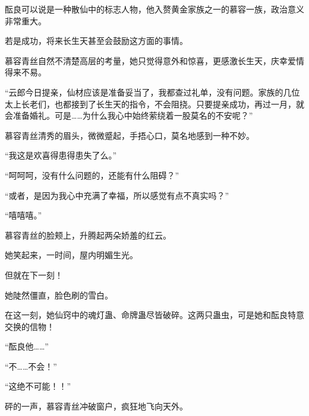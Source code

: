 \begin{this_body}
酝良可以说是一种散仙中的标志人物，他入赘黄金家族之一的慕容一族，政治意义非常重大。

若是成功，将来长生天甚至会鼓励这方面的事情。

慕容青丝自然不清楚高层的考量，她只觉得意外和惊喜，更感激长生天，庆幸爱情得来不易。

“云郎今日提亲，仙材应该是准备妥当了，我都查过礼单，没有问题。家族的几位太上长老们，也都接到了长生天的指令，不会阻挠。只要提亲成功，再过一月，就会准备婚礼。可是……为什么我心中始终萦绕着一股莫名的不安呢？”

慕容青丝清秀的眉头，微微蹙起，手捂心口，莫名地感到一种不妙。

“我这是欢喜得患得患失了么。”

“呵呵呵，没有什么问题的，还能有什么阻碍？”

“或者，是因为我心中充满了幸福，所以感觉有点不真实吗？”

“嘻嘻嘻。”

慕容青丝的脸颊上，升腾起两朵娇羞的红云。

她笑起来，一时间，屋内明媚生光。

但就在下一刻！

她陡然僵直，脸色刷的雪白。

在这一刻，她仙窍中的魂灯蛊、命牌蛊尽皆破碎。这两只蛊虫，可是她和酝良特意交换的信物！

“酝良他……”

“不……不会！”

“这绝不可能！！”

砰的一声，慕容青丝冲破窗户，疯狂地飞向天外。

\end{this_body}

